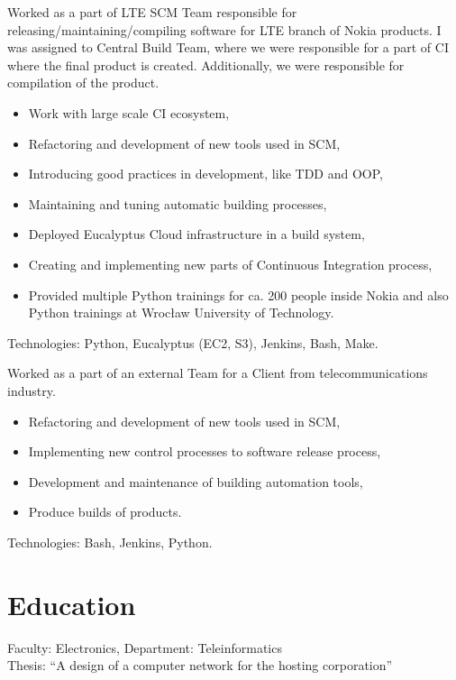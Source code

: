 \documentclass[11pt,a4paper,sans]{moderncv}
\newcommand{\newpara}{
        \vskip 0.2cm
    }
\begin{document}
%
    {}{}{
Worked as a part of LTE SCM Team responsible for releasing/maintaining/compiling software for LTE branch of Nokia
products. I was assigned to Central Build Team, where we were responsible for a
part of CI where the final product is created. Additionally, we were responsible for
compilation of the product.
\begin{itemize}
    \item Work with large scale CI ecosystem,
    \item Refactoring and development of new tools used in SCM,
    \item Introducing good practices in development, like TDD and OOP,
    \item Maintaining and tuning automatic building processes,
    \item Deployed Eucalyptus Cloud infrastructure in a build system,
    \item Creating and implementing new parts of Continuous Integration process,
    \item Provided multiple Python trainings for ca. 200 people inside Nokia and also Python trainings at Wrocław University of Technology.
\end{itemize}
\newpara
Technologies: Python, Eucalyptus (EC2, S3), Jenkins, Bash, Make.
}

%
    {}{}{
        Worked as a part of an external Team for a Client from telecommunications industry.
\begin{itemize}
    \item Refactoring and development of new tools used in SCM,
    \item Implementing new control processes to software release process,
    \item Development and maintenance of building automation tools,
    \item Produce builds of products.
\end{itemize}
\newpara
Technologies: Bash, Jenkins, Python.
}

\section{Education}
%
    {Faculty: Electronics, Department: Teleinformatics \\
    Thesis: “A design of a computer network for the hosting corporation”}
\end{document}
